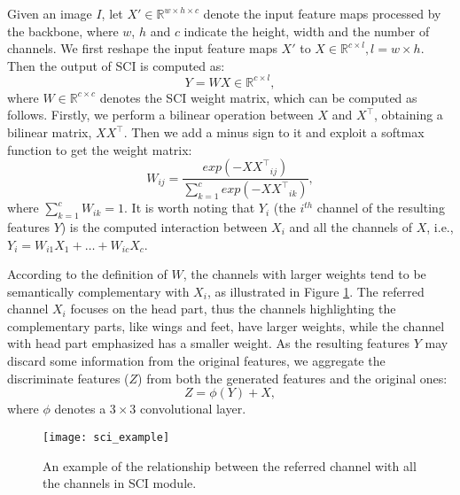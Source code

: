 \documentclass[letterpaper]{article} \usepackage{aaai20}  \usepackage{times}  \usepackage{helvet} \usepackage{courier}  \usepackage[hyphens]{url}  \usepackage{graphicx} \urlstyle{rm} \def\UrlFont{\rm}  \usepackage{graphicx}  \frenchspacing  \setlength{\pdfpagewidth}{8.5in}  \setlength{\pdfpageheight}{11in}  \usepackage{amsmath,amssymb}
\begin{document}
Given an image $I$, let $X' \in \mathbb{R}^{w \times h  \times c}$ denote the input feature maps processed by the backbone, where $w$, $h$ and $c$ indicate the height, width and the number of channels.
We first reshape the input feature maps $X'$ to $X \in \mathbb{R}^{c \times l}, l =w \times h$. Then the output of SCI is computed as:
\begin{equation}\label{eq:atten-output}
Y = WX \in \mathbb{R}^{c \times l},
\end{equation}
where $W \in  \mathbb{R}^{c \times c}$ denotes the SCI weight matrix, which can be computed as follows.
Firstly, we perform a bilinear operation between $X$ and $X^\top$, obtaining a bilinear matrix, $XX^\top$. Then we add a minus sign to it and exploit a softmax function to get the weight matrix:
\begin{equation}\label{eq:atten-input}
W_{ij} = \frac{exp(-{XX^\top}_{ij})}{\sum_{k=1}^{c}exp(-{XX^\top}_{ik})},
\end{equation}
where $\sum_{k=1}^cW_{ik} = 1$.
It is worth noting that $Y_i$ (the $i^{th}$ channel of the resulting features $Y$) is the computed interaction between $X_i$ and all the channels of $X$, i.e., $Y_i = W_{i1}X_1 + \dots + W_{ic}X_c$.

According to the definition of $W$, the channels with larger weights tend to be semantically complementary with $X_i$, as illustrated in Figure \ref{approach:sci}. The referred channel $X_i$ focuses on the head part, thus the channels highlighting the complementary parts, like wings and feet, have larger weights, while the channel with head part emphasized has a smaller weight. As the resulting features $Y$ may discard some information from the original features, we aggregate the  discriminate features ($Z$) from both the generated features and the original ones:
\begin{equation}\label{eq:sci-res}
Z = \phi(Y)+X,
\end{equation}
where $\phi$ denotes a $3 \times 3$ convolutional layer.

\begin{figure}[t]
\begin{center}
\texttt{[image: sci\_example]}
\end{center}
\caption{An example of the relationship between the referred channel with all the channels in SCI module.}
\label{approach:sci}
\end{figure}
\end{document}
